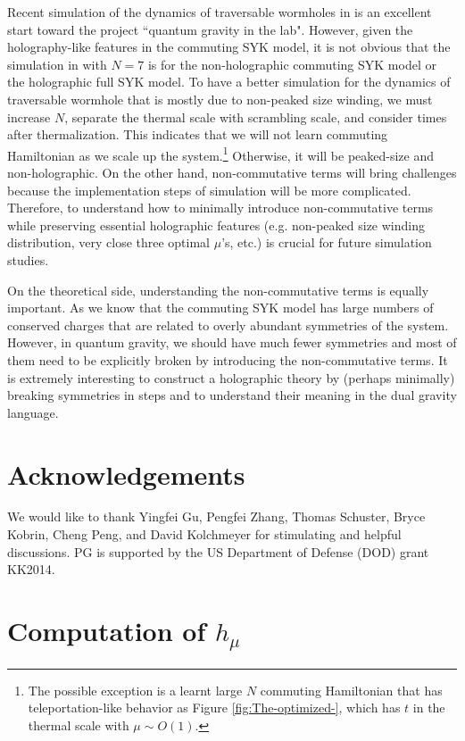 \documentclass[11pt]{article}
\renewcommand{\>}{\rangle}
\newcommand{\<}{\langle}
\begin{document}
Recent simulation of the dynamics of traversable wormholes in \cite{Jafferis:2022crx} is an excellent start toward the project ``quantum gravity in the lab". However, given the holography-like features in the commuting SYK model, it is not obvious that the simulation in \cite{Jafferis:2022crx} with $N=7$ is for the non-holographic commuting SYK model or the holographic full SYK model. To have a better simulation for the dynamics of traversable wormhole that is mostly due to non-peaked size winding, we must increase $N$, separate
the thermal scale with scrambling scale, and consider times after
thermalization. This indicates that we will not learn commuting Hamiltonian
as we scale up the system.\footnote{The possible exception is a learnt large $N$ commuting Hamiltonian
that has teleportation-like behavior as Figure \ref{fig:The-optimized-},
which has $t$ in the thermal scale with $\mu\sim O(1)$. } Otherwise, it will be peaked-size and non-holographic. On the other
hand, non-commutative terms will bring challenges because the implementation
steps of simulation will be more complicated. Therefore, to understand
how to minimally introduce non-commutative terms while preserving
essential holographic features (e.g. non-peaked size winding distribution,
very close three optimal $\mu$'s, etc.) is crucial for future simulation
studies.

On the theoretical side, understanding the non-commutative terms is
equally important. As we know that the commuting SYK model has large
numbers of conserved charges that are related to overly abundant symmetries
of the system. However, in quantum gravity, we should have much fewer
symmetries and most of them need to be explicitly broken by introducing
the non-commutative terms. It is extremely interesting to construct a holographic theory by (perhaps minimally) breaking symmetries in steps and to understand their meaning in the dual gravity language. 

\section*{Acknowledgements} We would like to thank Yingfei Gu, Pengfei Zhang, Thomas Schuster, Bryce Kobrin, Cheng Peng, and David Kolchmeyer for stimulating and helpful discussions. PG is supported by the US Department of Defense (DOD) grant  KK2014.


\appendix

\section{Computation of $h_{\mu}$\label{sec:Computation-of}}
\end{document}
